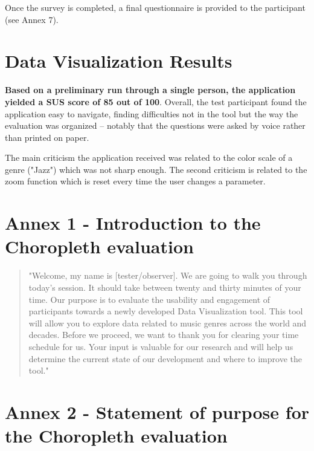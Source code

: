 \documentclass[twocolumn, letterpaper,13pt]{scrartcl}
\begin{document}
    Once the survey is completed, a final questionnaire is provided to the participant (see Annex 7).

    \section*{Data Visualization Results}
    
    \textbf{Based on a preliminary run through a single person, the application yielded a SUS score of 85 out of 100}. Overall, the test participant found the application easy to navigate, finding difficulties not in the tool but the way the evaluation was organized -- notably that the questions were asked by voice rather than printed on paper.
    
    The main criticism the application received was related to the color scale of a genre ("Jazz") which was not sharp enough. The second criticism is related to the zoom function which is reset every time the user changes a parameter.  

    \section*{Annex 1 - Introduction to the Choropleth evaluation}
    
    \begin{quote}
        "Welcome, my name is [tester/observer]. We are going to walk you through today's session. It should take between twenty and thirty minutes of your time. Our purpose is to evaluate the usability and engagement of participants towards a newly developed Data Visualization tool. This tool will allow you to explore data related to music genres across the world and decades.
        \newline\newline
        Before we proceed, we want to thank you for clearing your time schedule for us. Your input is valuable for our research and will help us determine the current state of our development and where to improve the tool."
    \end{quote}
    
    \section*{Annex 2 - Statement of purpose for the Choropleth evaluation}
    
\end{document}
